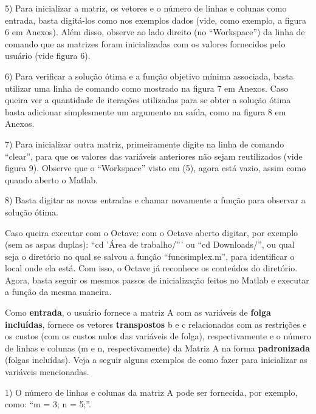 \documentclass[10pt]{article}
\begin{document}
5) Para inicializar a matriz, os vetores e o número de linhas e colunas como entrada, basta digitá-los como nos exemplos dados (vide, como exemplo, a figura 6 em Anexos). Além disso, observe ao lado direito (no ``Workspace'') da linha de comando que as matrizes foram inicializadas com os valores fornecidos pelo usuário (vide figura 6).
\newline

6) Para verificar a solução ótima e a função objetivo mínima associada, basta utilizar uma linha de comando como mostrado na figura 7 em Anexos. Caso queira ver a quantidade de iterações utilizadas para se obter a solução ótima basta adicionar simplesmente um argumento na saída, como na figura 8 em Anexos.
\newline

7) Para inicializar outra matriz, primeiramente digite na linha de comando ``clear'', para que os valores das variáveis anteriores não sejam reutilizados (vide figura 9). Observe que o ``Workspace'' visto em (5), agora está vazio, assim como quando aberto o Matlab.
\newline

8) Basta digitar as novas entradas e chamar novamente a função para observar a solução ótima. 
\newline

Caso queira executar com o Octave: com o Octave aberto digitar, por exemplo (sem as aspas duplas): ``cd 'Área de trabalho/''' ou ``cd Downloads/'', ou qual seja o diretório no qual se salvou a função ``funcsimplex.m'', para identificar o local onde ela está. Com isso, o Octave já reconhece os conteúdos do diretório. Agora, basta seguir os mesmos passos de inicialização feitos no Matlab e executar a função da mesma maneira.
\newline

Como \textbf{entrada}, o usuário fornece a matriz A com as variáveis de \textbf{folga incluídas}, fornece os vetores \textbf{transpostos} b e c relacionados com as restrições e os custos (com os custos nulos das variáveis de folga), respectivamente e o número de linhas e colunas (m e n, respectivamente) da Matriz A na forma \textbf{padronizada} (folgas incluídas). Veja a seguir alguns exemplos de como fazer para inicializar as variáveis mencionadas.
\newline

1) O número de linhas e colunas da matriz A pode ser fornecida, por exemplo, como: ``m = 3; n = 5;''.
\newline
\end{document}
